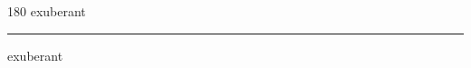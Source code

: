 
\begin{frame}
\begin{center}
\begin{turn}{180}
{\fontsize{2.5cm}{1em}\selectfont exuberant}
\end{turn}
\vspace{1em}\par  
\hrule
\vspace{1em}\par  
{\fontsize{2.5cm}{1em}\selectfont exuberant}
\end{center}
\end{frame}
